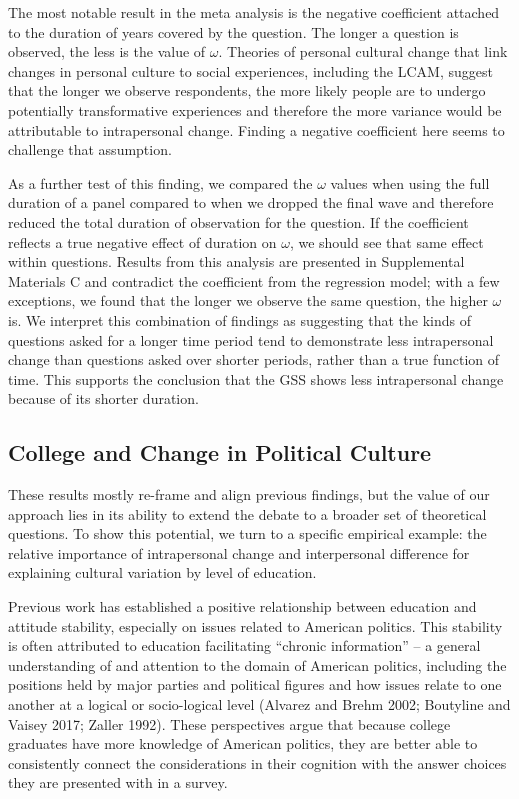 \documentclass[
  12pt,
]{article}
\begin{document}
The most notable result in the meta analysis is the negative coefficient
attached to the duration of years covered by the question. The longer a
question is observed, the less is the value of \(\omega\). Theories of
personal cultural change that link changes in personal culture to social
experiences, including the LCAM, suggest that the longer we observe
respondents, the more likely people are to undergo potentially
transformative experiences and therefore the more variance would be
attributable to intrapersonal change. Finding a negative coefficient
here seems to challenge that assumption.

As a further test of this finding, we compared the \(\omega\) values
when using the full duration of a panel compared to when we dropped the
final wave and therefore reduced the total duration of observation for
the question. If the coefficient reflects a true negative effect of
duration on \(\omega\), we should see that same effect within questions.
Results from this analysis are presented in Supplemental Materials C and
contradict the coefficient from the regression model; with a few
exceptions, we found that the longer we observe the same question, the
higher \(\omega\) is. We interpret this combination of findings as
suggesting that the kinds of questions asked for a longer time period
tend to demonstrate less intrapersonal change than questions asked over
shorter periods, rather than a true function of time. This supports the
conclusion that the GSS shows less intrapersonal change because of its
shorter duration.

\hypertarget{college-and-change-in-political-culture}{%
\subsection{College and Change in Political
Culture}\label{college-and-change-in-political-culture}}

These results mostly re-frame and align previous findings, but the value
of our approach lies in its ability to extend the debate to a broader
set of theoretical questions. To show this potential, we turn to a
specific empirical example: the relative importance of intrapersonal
change and interpersonal difference for explaining cultural variation by
level of education.

Previous work has established a positive relationship between education
and attitude stability, especially on issues related to American
politics. This stability is often attributed to education facilitating
``chronic information'' -- a general understanding of and attention to
the domain of American politics, including the positions held by major
parties and political figures and how issues relate to one another at a
logical or socio-logical level (Alvarez and Brehm 2002; Boutyline and
Vaisey 2017; Zaller 1992). These perspectives argue that because college
graduates have more knowledge of American politics, they are better able
to consistently connect the considerations in their cognition with the
answer choices they are presented with in a survey.
\end{document}
